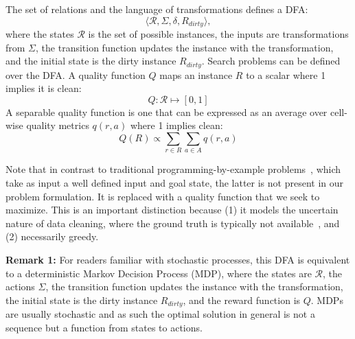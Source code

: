     The set of relations and the language of transformations defines a DFA:
    \[\langle \mathcal{R}, \Sigma, \delta, R_{dirty}\rangle, \]
    where the states $\mathcal{R}$ is the set of possible instances, the inputs are transformations from $\Sigma$, the transition function updates the instance with the transformation, and the initial state is the dirty instance $R_{dirty}$. Search problems can be defined over the DFA. 
    A quality function $Q$ maps an instance $R$ to a scalar where 1 implies it is clean:
    \[
    Q: \mathcal{R} \mapsto [0,1]
    \]
    A separable quality function is one that can be expressed as an average over cell-wise quality metrics $q(r,a)$ where 1 implies clean:
    \[
    Q(R) \propto \sum_{r \in R} \sum_{a \in A} q(r,a)
    \]

    Note that in contrast to traditional programming-by-example problems~\cite{}, which take as input a well defined input and goal state, the latter is not present in our problem formulation.  It is replaced with a quality function that we seek to maximize.  This is an important distinction because (1) it models the uncertain nature of data cleaning, where the ground truth is typically not available~\cite{}, and (2) necessarily greedy.

    \vspace{0.5em} \noindent \textbf{Remark 1: } For readers familiar with stochastic processes, this DFA is equivalent to a deterministic Markov Decision Process (MDP), where the states are $\mathcal{R}$, the actions $\Sigma$, the transition function updates the instance with the transformation, the initial state is the dirty instance $R_{dirty}$, and the reward function is $Q$. MDPs are usually stochastic and as such the optimal solution in general is not a sequence but a function from states to actions.



\fi







